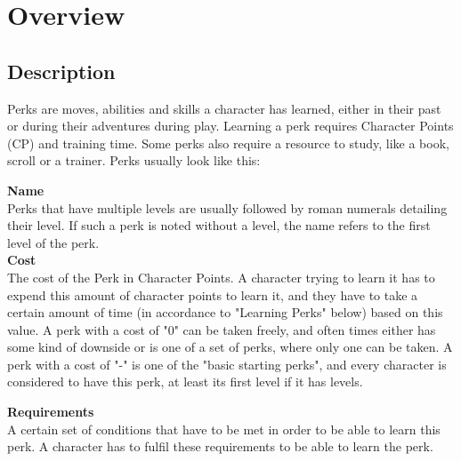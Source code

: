 \chapter{Overview}\label{ch:perksOverview}
\section{Description}\label{sec:perkDescription}
Perks are moves, abilities and skills a character has learned, either in their past or during their adventures during play.
Learning a perk requires Character Points (CP) and training time.
Some perks also require a resource to study, like a book, scroll or a trainer.
Perks usually look like this:

\textbf{Name}\\
Perks that have multiple levels are usually followed by roman numerals detailing their level.
If such a perk is noted without a level, the name refers to the first level of the perk.\\

\textbf{Cost}\\
The cost of the Perk in Character Points.
A character trying to learn it has to expend this amount of character points to learn it, and they have to take a certain amount of time (in accordance to "Learning Perks" below) based on this value. A perk with a cost of "0" can be taken freely, and often times either has some kind of downside or is one of a set of perks, where only one can be taken. A perk with a cost of "-" is one of the "basic starting perks", and every character is considered to have this perk, at least its first level if it has levels.

\textbf{Requirements}\\
A certain set of conditions that have to be met in order to be able to learn this perk.
A character has to fulfil these requirements to be able to learn the perk.

